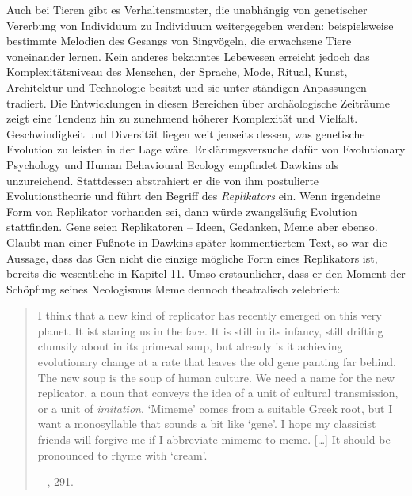 \documentclass[openany,twoside,twocolumn]{book}
\begin{document}
Auch bei Tieren gibt es Verhaltensmuster, die unabhängig von genetischer
Vererbung von Individuum zu Individuum weitergegeben werden:
beispielsweise bestimmte Melodien des Gesangs von Singvögeln, die
erwachsene Tiere voneinander lernen. Kein anderes bekanntes Lebewesen
erreicht jedoch das Komplexitätsniveau des Menschen, der Sprache, Mode,
Ritual, Kunst, Architektur und Technologie besitzt und sie unter
ständigen Anpassungen tradiert. Die Entwicklungen in diesen Bereichen
über archäologische Zeiträume zeigt eine Tendenz hin zu zunehmend
höherer Komplexität und Vielfalt. Geschwindigkeit und Diversität liegen
weit jenseits dessen, was genetische Evolution zu leisten in der Lage
wäre. Erklärungsversuche dafür von Evolutionary Psychology und Human
Behavioural Ecology empfindet Dawkins als unzureichend. Stattdessen
abstrahiert er die von ihm postulierte Evolutionstheorie und führt den
Begriff des \emph{Replikators} ein. Wenn irgendeine Form von Replikator
vorhanden sei, dann würde zwangsläufig Evolution stattfinden. Gene seien
Replikatoren -- Ideen, Gedanken, Meme aber ebenso. Glaubt man einer
Fußnote in Dawkins später kommentiertem Text, so war die Aussage, dass
das Gen nicht die einzige mögliche Form eines Replikators ist, bereits
die wesentliche in Kapitel 11. Umso erstaunlicher, dass er den Moment
der Schöpfung seines Neologismus Meme dennoch theatralisch zelebriert:

\begin{quote}
I think that a new kind of replicator has recently emerged on this very
planet. It ist staring us in the face. It is still in its infancy, still
drifting clumsily about in its primeval soup, but already is it
achieving evolutionary change at a rate that leaves the old gene panting
far behind. The new soup is the soup of human culture. We need a name
for the new replicator, a noun that conveys the idea of a unit of
cultural transmission, or a unit of \emph{imitation}. `Mimeme' comes
from a suitable Greek root, but I want a monosyllable that sounds a bit
like `gene'. I hope my classicist friends will forgive me if I
abbreviate mimeme to meme. {[}\ldots{}{]} It should be pronounced to
rhyme with `cream'.

-- \textcite{Dawkinsselfishgene40th2016}, 291.
\end{quote}
\end{document}

